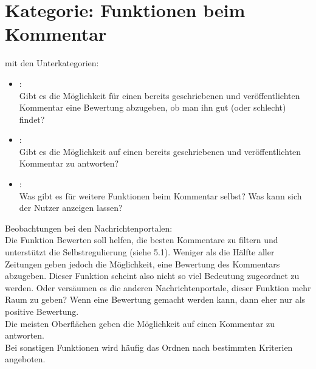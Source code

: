 \section{Kategorie: \glqq Funktionen beim Kommentar\grqq}

mit den Unterkategorien:
\begin{itemize}
\item{}\grqq:\\
Gibt es die Möglichkeit für einen bereits geschriebenen und veröffentlichten Kommentar eine Bewertung abzugeben, ob man ihn gut (oder schlecht) findet?

\item{}\grqq: \\
Gibt es die Möglichkeit auf einen bereits geschriebenen und veröffentlichten Kommentar zu antworten?


\item{}\grqq:\\
Was gibt es für weitere Funktionen beim Kommentar selbst? Was kann sich der Nutzer anzeigen lassen? 


\end{itemize}

Beobachtungen bei den Nachrichtenportalen:\\

Die Funktion \glqq Bewerten\grqq \- soll helfen,
die besten Kommentare zu filtern und unterstützt die Selbstregulierung (siehe 5.1). 
Weniger als die Hälfte aller Zeitungen geben jedoch die Möglichkeit, eine
Bewertung des Kommentars abzugeben. Dieser Funktion
scheint also nicht so viel Bedeutung zugeordnet zu werden. 
Oder versäumen es die anderen
Nachrichtenportale, dieser Funktion mehr Raum zu geben?
Wenn eine Bewertung gemacht werden kann,
dann eher nur als positive Bewertung. \\

Die meisten Oberflächen geben die Möglichkeit auf einen Kommentar
zu antworten. \\
Bei \glqq sonstigen Funktionen\grqq\- wird häufig das
Ordnen nach bestimmten Kriterien angeboten. 



